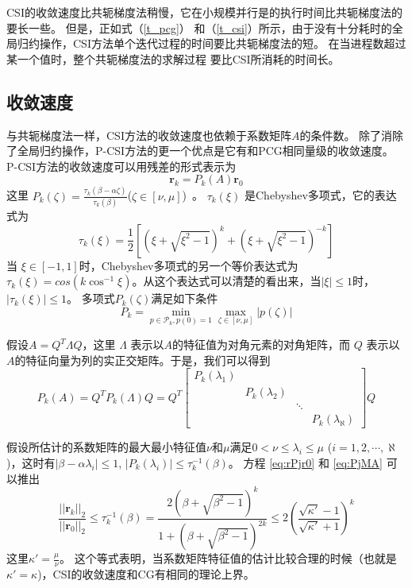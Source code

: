 CSI的收敛速度比共轭梯度法稍慢，它在小规模并行是的执行时间比共轭梯度法的要长一些。 
但是，正如式（\ref{t_pcg}） 和（\ref{t_csi}）所示，由于没有十分耗时的全局归约操作，CSI方法单个迭代过程的时间要比共轭梯度法的短。 
在当进程数超过某一个值时，整个共轭梯度法的求解过程 要比CSI所消耗的时间长。 


\subsection{收敛速度} \label{solver:CSI:convergence_rate}

 
与共轭梯度法一样，CSI方法的收敛速度也依赖于系数矩阵$A$的条件数。  
除了消除了全局归约操作，P-CSI方法的更一个优点是它有和PCG相同量级的收敛速度。 
P-CSI方法的收敛速度可以用残差的形式表示为
\begin{equation}
\textbf{r}_k = P_k(A)\textbf{r}_0 \label{eq:rPjr0}
\end{equation}
这里
$P_k(\zeta) = \frac{\tau_k(\beta-\alpha \zeta)}{\tau_k(\beta)}$($ \zeta \in [\nu, \mu]$)~\cite{stiefel1958kernel}。
$\tau_k(\xi)$ 是Chebyshev多项式，它的表达式为  
\begin{equation*}
\tau_k(\xi) =   \frac{1}{2}[(\xi+\sqrt{\xi^2-1})^k+(\xi+\sqrt{\xi^2-1})^{-k}]
\end{equation*}
当 $ \xi \in [-1,1]$时，Chebyshev多项式的另一个等价表达式为$\tau_k(\xi) = cos(k\cos^{-1} \xi)$。从这个表达式可以清楚的看出来，当$| \xi | \le 1$时，$|\tau_k(\xi)| \le 1$。
多项式$P_k(\zeta)$满足如下条件
\begin{equation}
P_k = \min_{p\in \mathcal{P}_k, p(0) = 1 }\max_{\zeta \in [\nu,\mu]} |p(\zeta)|
\end{equation}


假设$A= Q^T\Lambda Q$，这里 $\Lambda$ 表示以$A$的特征值为对角元素的对角矩阵，而 $Q$ 表示以  $A$的特征向量为列的实正交矩阵。于是，我们可以得到
\begin{equation}
P_k(A) = Q^T P_k(\Lambda)Q = Q^T \left [\begin{array}{cccc}
P_k(\lambda_1) & & &\\
& P_k(\lambda_2) & &\\
& & \ddots &\\
 & & & P_k(\lambda_\aleph)
\end{array} \right ] Q \label{eq:PjMA}
\end{equation}
 
假设所估计的系数矩阵的最大最小特征值$\nu$和$\mu$满足$0 < \nu \le \lambda_i \le \mu$ ($i = 1, 2, \cdots, \aleph$)，这时有$|\beta - \alpha \lambda_i| \le 1$, $|P_k(\lambda_i)| \le \tau^{-1}_k (\beta)$。
方程 \ref{eq:rPjr0} 和 \ref{eq:PjMA} 可以推出
\begin{equation}
\label{pcsi_convergence}
\frac{||\textbf{r}_k||_2}{||\textbf{r}_0||_2}  \le  \tau_k^{-1}(\beta) = \frac{2(\beta+\sqrt{\beta^2-1})^k}{1+(\beta+\sqrt{\beta^2-1})^{2k}} \le 2(\frac{\sqrt{\kappa'}-1}{\sqrt{\kappa'}+1})^k
\end{equation}
这里$\kappa' = \frac{\mu}{\nu}$。
这个等式表明，当系数矩阵特征值的估计比较合理的时候（也就是$\kappa' =\kappa$)，CSI的收敛速度和CG有相同的理论上界。


